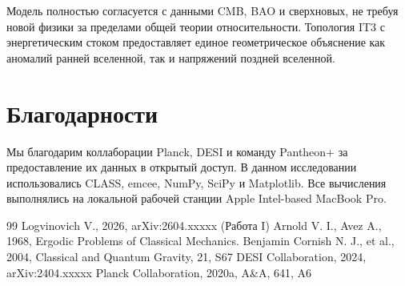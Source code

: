 \documentclass[12pt,a4paper]{article}
\begin{document}
Модель полностью согласуется с данными CMB, BAO и сверхновых, не требуя новой физики за пределами общей теории относительности. Топология IT3 с энергетическим стоком предоставляет единое геометрическое объяснение как аномалий ранней вселенной, так и напряжений поздней вселенной.

\section*{Благодарности}
Мы благодарим коллаборации Planck, DESI и команду Pantheon+ за предоставление их данных в открытый доступ. В данном исследовании использовались CLASS, emcee, NumPy, SciPy и Matplotlib. Все вычисления выполнялись на локальной рабочей станции Apple Intel-based MacBook Pro.

\begin{thebibliography}{99}
 Logvinovich V., 2026, arXiv:2604.xxxxx (Работа I)
 Arnold V. I., Avez A., 1968, Ergodic Problems of Classical Mechanics. Benjamin
 Cornish N. J., et al., 2004, Classical and Quantum Gravity, 21, S67
 DESI Collaboration, 2024, arXiv:2404.xxxxx
 Planck Collaboration, 2020a, A\&A, 641, A6
\end{thebibliography}
\end{document}
